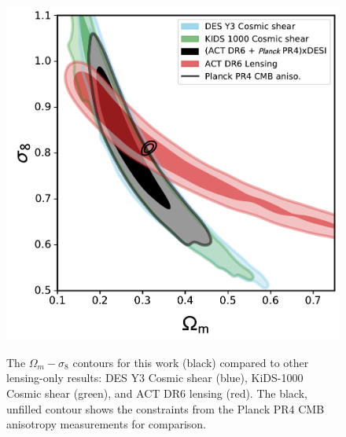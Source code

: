 \documentclass[twocolumn]{aastex631}
\begin{document}
{\begin{figure}
    \centering
    \includegraphics[width=\linewidth]{figures/test.pdf} \\ %
    \caption{The $\Omega_m-\sigma_8$ contours for this work (black) compared to other lensing-only results: DES Y3 Cosmic shear (blue), KiDS-1000 Cosmic shear (green), and ACT DR6 lensing (red). The  black, unfilled contour shows the constraints from the Planck PR4 CMB anisotropy measurements for comparison. }
    \label{fig: compilation_lensing}
\end{figure}


}
\end{document}

